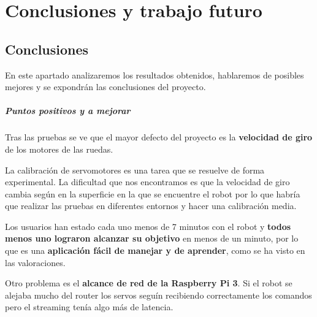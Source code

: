 \documentclass[twoside, 11pt]{epstfg}
\begin{document}
%
%
%
%






\chapter{Conclusiones y trabajo futuro}
\label{chap:conclusiones}
\vspace{-0.2cm}

\section{Conclusiones}
En este apartado analizaremos los resultados obtenidos, hablaremos de posibles mejores y se expondrán las conclusiones del proyecto.

\paragraph{Puntos positivos y a mejorar}

Tras las pruebas se ve que el mayor defecto del proyecto es la \textbf{velocidad de giro} de los motores de las ruedas.

La calibración de servomotores es una tarea que se resuelve de forma experimental. La dificultad que nos encontramos es que la velocidad de giro cambia según en la superficie en la que se encuentre el robot por lo que habría que realizar las pruebas en diferentes entornos y hacer una calibración media.

Los usuarios han estado cada uno menos de 7 minutos con el robot y \textbf{todos menos uno lograron alcanzar su objetivo} en menos de un minuto, por lo que es una \textbf{aplicación fácil de manejar y de aprender}, como se ha visto en las valoraciones.

Otro problema es el \textbf{alcance de red de la Raspberry Pi 3}. Si el robot se alejaba mucho del router los servos seguín recibiendo correctamente los comandos pero el streaming tenía algo más de latencia.
\end{document}
